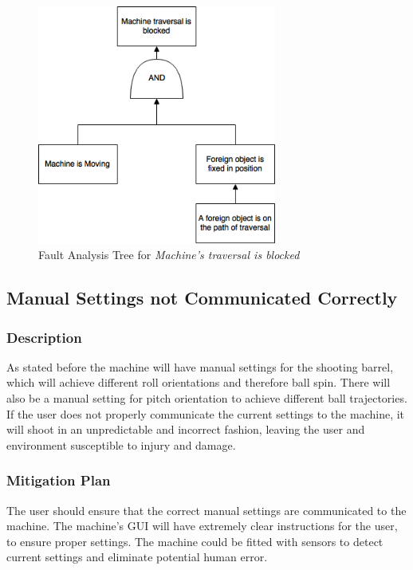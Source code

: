 \documentclass[11pt]{article}
\begin{document}
\begin{figure}[H]
   \centering
   \includegraphics[width=0.7\textwidth]{img/ft-traverse.png} %
   \caption{Fault Analysis Tree for \textit{Machine's traversal is blocked}}
   \label{fig:ft-traverse}
\end{figure}

\subsection{Manual Settings not Communicated Correctly}
\subsubsection*{Description}
As stated before the machine will have manual settings for the shooting barrel, which will achieve different roll orientations and therefore ball spin. There will also be a manual setting for pitch orientation to achieve different ball trajectories. If the user does not properly communicate the current settings to the machine, it will shoot in an unpredictable and incorrect fashion, leaving the user and  environment susceptible to injury and damage.
\subsubsection*{Mitigation Plan}
The user should ensure that the correct manual settings are communicated to the machine. The machine's GUI will have extremely clear instructions for the user, to ensure proper settings. The machine could be fitted with sensors to detect current settings and eliminate potential human error. \\ \\
\end{document}
